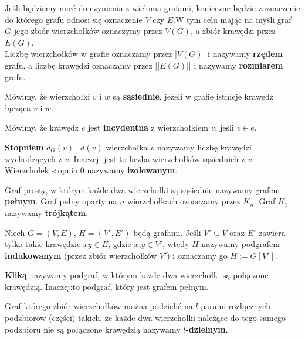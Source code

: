 \documentclass[miz,woman]{mgrwms}
\begin{document}
Jeśli będziemy mieć do czynienia z wieloma grafami, konieczne będzie zaznaczenie do którego grafu odnosi się oznaczenie
$V$ czy $E$.W tym celu mając na myśli graf $G$ jego zbiór wierzchołków oznaczymy przez $V(G)$, a zbiór krawędzi przez $E(G)$.\\
Liczbę wierzchołków w grafie oznaczamy przez |$V(G)$| i nazywamy \textbf{rzędem} grafu, a liczbę krawędzi oznaczamy przez 
||$E(G)$|| i nazywamy \textbf{rozmiarem} grafu.\\
\begin{defi}
 Mówimy, że wierzchołki $v$ i $w$ są \textbf{sąsiednie}, jeżeli w grafie istnieje krawędź łącząca $v$ i $w$.
\end{defi}
\begin{defi}
 Mówimy, że krawędź $e$ jest \textbf{incydentna} z wierzchołkiem $v$, jeśli $v \in e$.
\end{defi}
\begin {defi}
 \textbf{Stopniem} $d_G(v)$=$d(v)$ wierzchołka $v$ nazywamy liczbę krawędzi wychodzących z $v$. Inaczej: jest to liczba
 wierzchołków sąsiednich z $v$. Wierzchołek stopnia 0 nazywamy \textbf{izolowanym}.
\end {defi}
\begin{defi}
 Graf prosty, w którym każde dwa wierzchołki są sąsiednie nazywamy grafem \textbf{pełnym}. Graf pełny oparty na $n$ 
wierzchołkach oznaczamy przez $K_n$. Graf $K_3$ nazywamy \textbf{trójkątem}.
\end{defi}
\begin{defi}
Niech $G=(V,E)$, $H=(V',E')$ będą grafami. Jeśli $V'\subseteq V$ oraz $E'$ zawiera tylko takie krawędzie $xy\in E$, gdzie 
$x$,$y \in V'$, wtedy $H$ nazywamy podgrafem \textbf{indukowanym} (przez zbiór wierzchołków $V'$) i oznaczamy go $H:=G[V']$.
\end{defi}
\begin{defi}
 \textbf{Kliką} nazywamy podgraf, w którym każde dwa wierzchołki są połączone krawędzią. Inaczej:to podgraf, który jest 
grafem pełnym.
\end{defi}

\begin{defi}
 Graf którego zbiór wierzchołków można podzielić na $l$ parami rozłącznych podzbiorów (części) takich, że każde dwa wierzchołki
należące do tego samego podzbioru nie są połączone krawędzią nazywamy \textbf{$l$-dzielnym}.
\end{defi}
\end{document}
